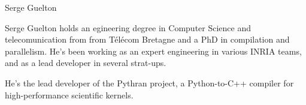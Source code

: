 \begin{participant}[type=R,PM=12,gender=male]{Serge Guelton}

    Serge Guelton holds an egineering degree in Computer Science and
    telecomunication from from Télécom Bretagne and a PhD in compilation and
    parallelism. He's been working as an expert engineering in various INRIA
    teams, and as a lead developer in several strat-ups.

    He's the lead developer of the Pythran project, a Python-to-C++ compiler
    for high-performance scientific kernels.

\end{participant}
